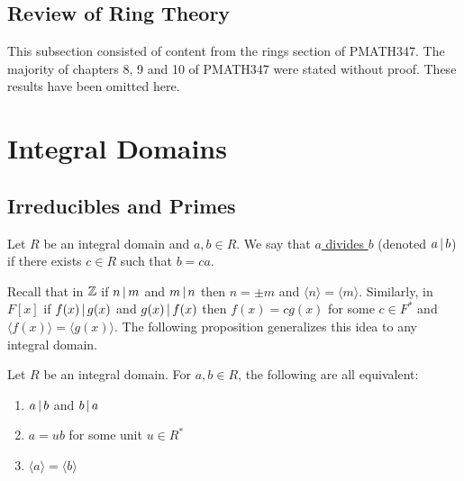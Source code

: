 \documentclass[11pt]{article}
\begin{document}
\subsection{Review of Ring Theory}

This subsection consisted of content from the rings section of PMATH347. The majority of chapters 8, 9 and 10 of PMATH347 were stated without proof. These results have been omitted here.

\pagebreak

\section{Integral Domains}

\subsection{Irreducibles and Primes}

\begin{definition}[Divisibility]
    Let $R$ be an integral domain and $a,b\in R$. We say that \ul{$a$ divides $b$} (denoted $a\,|\, b$) if there exists $c\in R$ such that $b=ca$.
\end{definition}

\begin{remark}
    Recall that in $\mathbb{Z}$ if $n\,|\, m$ and $m\,|\, n$ then $n=\pm m$ and $\langle n\rangle=\langle m\rangle$. Similarly, in $F[x]$ if $f(x)\,|\, g(x)$ and $g(x)\,|\, f(x)$ then $f(x)=cg(x)$ for some $c\in F^*$ and $\langle f(x)\rangle=\langle g(x)\rangle$. The following proposition generalizes this idea to any integral domain.
\end{remark}

\begin{proposition}
    Let $R$ be an integral domain. For $a,b\in R$, the following are all equivalent:
    \begin{enumerate}
        \item $a\,|\, b$ and $b\,|\, a$
        \item $a=ub$ for some unit $u\in R^*$
        \item $\langle a \rangle=\langle b\rangle$
    \end{enumerate}
\end{proposition}
\end{document}

